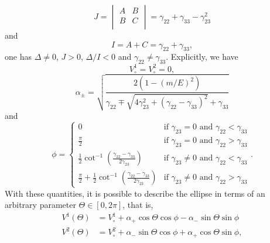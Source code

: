 %
\begin{equation}
  J = 
  \begin{vmatrix}
    A & B \\
    B & C \\
  \end{vmatrix}
  = \gamma_{22} + \gamma_{33} - \gamma_{23}^2
  \label{eq:arbitrary_penrose_quadratic_J}
\end{equation}
%
and
%
\begin{equation}
  I = A + C = \gamma_{22} + \gamma_{33},
  \label{eq:arbitrary_penrose_quadratic_I}
\end{equation}
%
one has $\Delta \neq 0$, $J > 0$, $\Delta/I < 0$ and $\gamma_{22} \neq \gamma_{33}$. Explicitly, we have~\cite{Larson2006, Young2010, Lawrence2014}
%
\begin{equation}
  V^1_\circ = V^2_\circ = 0,
  \label{eq:arbitrary_penrose_ellipse_centers}
\end{equation}
%
\begin{equation}
  \alpha_\pm = \sqrt{ \frac{2 \left( 1 - \left(m/E\right)^2 \right)}{\gamma_{22} \mp \sqrt{4 \gamma_{23}^2 + \left( \gamma_{22} - \gamma_{33} \right)^2} +\gamma_{33}} }
  \label{eq:arbitrary_penrose_ellipse_axis}
\end{equation}
%
and
\begin{equation}
  \phi =
  \begin{cases}
    0                                                                                                 & \text{if } \gamma_{23} = 0 \text{ and } \gamma_{22} < \gamma_{33}    \\
    \frac{\pi}{2}                                                                                     & \text{if } \gamma_{23} = 0 \text{ and } \gamma_{22} > \gamma_{33}    \\
    \frac{1}{2} \cot^{-1} \left( \frac{\gamma_{22}-\gamma_{33}}{2\gamma_{23}} \right)                 & \text{if } \gamma_{23} \neq 0 \text{ and } \gamma_{22} < \gamma_{33} \\
    \frac{\pi}{2} + \frac{1}{2} \cot^{-1} \left( \frac{\gamma_{22}-\gamma_{33}}{2\gamma_{23}} \right) & \text{if } \gamma_{23} \neq 0 \text{ and } \gamma_{22} > \gamma_{33}
  \end{cases}
  .
  \label{eq:arbitrary_penrose_ellipse_angle}
\end{equation}
%
With these quantities, it is possible to describe the ellipse in terms of an arbitrary parameter $\Theta \in \left[0,2\pi\right]$, that is,
%
\begin{align}
  V^{1}\left(\Theta\right) & =  V^{1}_\circ + \alpha_{+} \cos\Theta\cos\phi - \alpha_{-}\sin\Theta\sin\phi                                                  \label{eq:arbitrary_penrose_ellipse_parametric_1} \\
  V^{2}\left(\Theta\right) & = V^{2}_\circ + \alpha_{-} \sin\Theta\cos\phi + \alpha_{+}\cos\Theta\sin\phi, \label{eq:arbitrary_penrose_ellipse_parametric_2}
\end{align}
